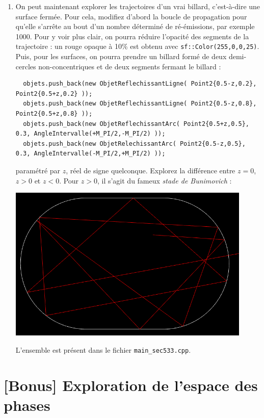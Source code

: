 \documentclass{book}
\newcommand{\inline}[1]{\texttt{#1}}
\def\filename{\texttt}
\begin{document}
\begin{enumerate}
  \item On peut maintenant explorer les trajectoires d'un vrai billard, c'est-à-dire une surface fermée. Pour cela, modifiez d'abord la boucle de propagation pour qu'elle s'arrête au bout d'un nombre déterminé de ré-émissions, par exemple 1000. Pour y voir plus clair, on pourra réduire l'opacité des segments de la trajectoire : un rouge opaque à 10\% est obtenu avec \inline{sf::Color(255,0,0,25)}. Puis, pour les surfaces, on pourra prendre un billard formé de deux demi-cercles non-concentriques et de deux segments fermant le billard :
  \begin{verbatim}
  objets.push_back(new ObjetReflechissantLigne( Point2{0.5-z,0.2}, Point2{0.5+z,0.2} ));
  objets.push_back(new ObjetReflechissantLigne( Point2{0.5-z,0.8}, Point2{0.5+z,0.8} ));
  objets.push_back(new ObjetReflechissantArc( Point2{0.5+z,0.5}, 0.3, AngleIntervalle(+M_PI/2,-M_PI/2) ));
  objets.push_back(new ObjetRelechissantArc( Point2{0.5-z,0.5}, 0.3, AngleIntervalle(-M_PI/2,+M_PI/2) ));
  \end{verbatim}
  paramétré par $z$, réel de signe quelconque. Explorez la différence entre $z=0$, $z>0$ et $z<0$. Pour $z>0$, il s'agit du fameux \emph{stade de Bunimovich} :
  \begin{center}
  \includegraphics[height=20em]{TD5bis/bunimovich-stadium.png}
  \end{center}

\begin{correction}
L'ensemble est présent dans le fichier \filename{main\_sec533.cpp}.
\end{correction}

\end{enumerate}

\section{[Bonus] Exploration de l'espace des phases}
\end{document}
